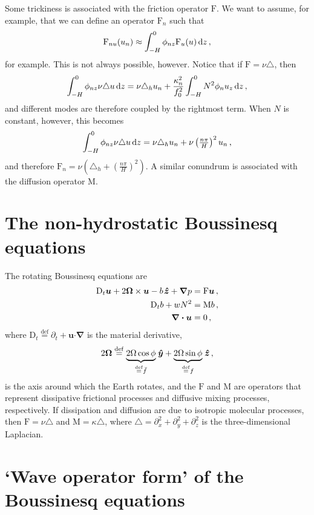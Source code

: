 \documentclass[12pt, oneside]{article}
\newcommand{\com}{\, ,}
\newcommand{\defn}{\ensuremath{\stackrel{\mathrm{def}}{=}}}
\newcommand{\beq}{\begin{equation}}
\newcommand{\eeq}{\end{equation}}
\newcommand{\p}{\partial}
\newcommand{\bnabla}{\boldsymbol \nabla}
\newcommand{\bcdot}{\boldsymbol \cdot}
\newcommand{\hlap}{\triangle_h}
\newcommand{\lap}{\triangle}
\newcommand{\bu}{\boldsymbol u}
\newcommand{\byh}{\hspace{0.1em}\boldsymbol{\hat y}}
\newcommand{\bzh}{\hspace{0.1em}\boldsymbol{\hat z}}
\newcommand{\bOmega}{\boldsymbol \Omega}
\newcommand{\kap}{\kappa}
\newcommand{\id}{{\, \rm d}}
\newcommand{\Dt}[1]{\mathrm{D}_t #1}
\newcommand{\friction}{\mathrm{F}}
\newcommand{\mixing}{\mathrm{M}}
\begin{document}
Some trickiness is associated with the friction operator $\friction$. We want to assume, for example, that we can define an operator $\friction_n$ such that
\beq
\friction_{nu} (u_n) \approx \int_{-H}^0 \phi_{nz} \friction_u(u) \id z \com
\label{approximateFriction}
\eeq
for example. This is not always possible, however.  Notice that if $\friction = \nu \lap$, then
\beq
\int_{-H}^0 \phi_{nz} \nu \lap u \id z = \nu \hlap u_n + \frac{\kappa_n^2}{f_0^2} \int_{-H}^0 N^2 \phi_n u_{z} \id z \com
\eeq
and different modes are therefore coupled by the rightmost term. When $N$ is constant, however, this becomes 
\beq
\int_{-H}^0 \phi_{nz} \nu \lap u \id z = \nu \hlap u_n + \nu \left ( \tfrac{n \pi}{H} \right )^2 u_n \com
\eeq
and therefore $\friction_n = \nu \left ( \hlap + \left ( \tfrac{n \pi}{H} \right )^2 \right )$. A similar conundrum is associated with the diffusion operator $\mixing$.

\appendix

\section{The non-hydrostatic Boussinesq equations}

The rotating Boussinesq equations are
\begin{align}
\Dt{\bu} + 2 \bOmega \times \bu - b \bzh + \bnabla p &= \friction \bu \com \label{mom} \\
\Dt{b} + w N^2 &= \mixing b \com \label{buoy} \\
\bnabla \bcdot \bu &= 0 \com \label{cont}
\end{align}
where $\Dt \defn \p_t + \bu \bcdot \bnabla$ is the material derivative, 
\beq
2 \bOmega \defn \underbrace{2 \Omega \cos \phi}_{\defn \breve f} \byh + \underbrace{2 \Omega \sin \phi}_{\defn f} \bzh \com
\eeq
is the axis around which the Earth rotates, and the $\friction$ and $\mixing$ are operators that represent dissipative frictional processes and diffusive mixing processes, respectively. If dissipation and diffusion are due to isotropic molecular processes, then $\friction = \nu \lap$ and $\mixing = \kap \lap$, where $\lap = \p_x^2 + \p_y^2 + \p_z^2$ is the three-dimensional Laplacian. 

\section{`Wave operator form' of the Boussinesq equations}
\label{waveOperatorForm}
\end{document}
